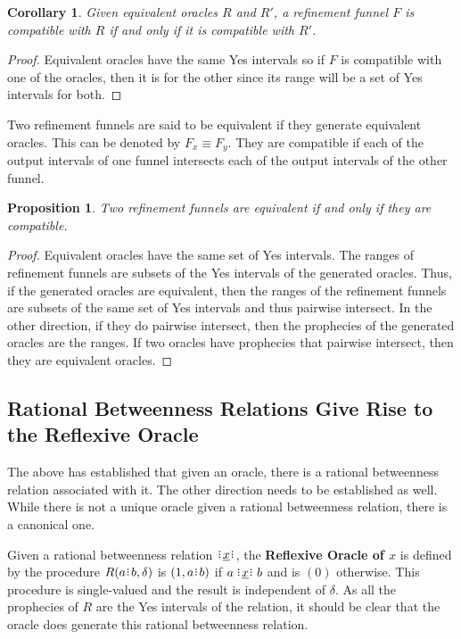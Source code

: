 \documentclass[12pt]{article}
\newtheorem{corollary}{Corollary}[section]
\newtheorem{proposition}{Proposition}[section]
\begin{document}
\begin{corollary}
    Given equivalent oracles $R$ and $R'$, a refinement funnel $F$ is compatible with $R$ if and only if it is compatible with $R'$.
\end{corollary}

\begin{proof}
    Equivalent oracles have the same Yes intervals so if $F$ is compatible with one of the oracles, then it is for the other since its range will be a set of Yes intervals for both. 
\end{proof}

Two refinement funnels are said to be equivalent if they generate equivalent oracles. This can be denoted by $F_x \equiv F_y$. They are compatible if each of the output intervals of one funnel intersects each of the output intervals of the other funnel. 

\begin{proposition}\label{os-prop-refine-equiv}
    Two refinement funnels are equivalent if and only if they are compatible. 
\end{proposition}

\begin{proof}
    Equivalent oracles have the same set of Yes intervals. The ranges of refinement funnels are subsets of the Yes intervals of the generated oracles. Thus, if the generated oracles are equivalent, then the ranges of the refinement funnels are subsets of the same set of Yes intervals and thus pairwise intersect. In the other direction, if they do pairwise intersect, then the prophecies of the generated oracles are the ranges. If two oracles have prophecies that pairwise intersect, then they are equivalent oracles. 
\end{proof}



\subsection{Rational Betweenness Relations Give Rise to the Reflexive Oracle}

The above has established that given an oracle, there is a rational betweenness relation associated with it. The other direction needs to be established as well. While there is not a unique oracle given a rational betweenness relation, there is a canonical one. 

Given a rational betweenness relation $\xrel$, the \textbf{Reflexive Oracle of $x$} is defined by the procedure $R(a\rint b, \delta)$ is $(1, a\rint b)$ if $a \xrel b$ and is $(0)$ otherwise. This procedure is single-valued and the result is independent of $\delta$. As all the prophecies of $R$ are the Yes intervals of the relation, it should be clear that the oracle does generate this rational betweenness relation. 
\end{document}
